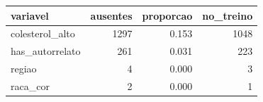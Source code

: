 \begin{tabular}{lrrr}
\toprule
variavel & ausentes & proporcao & no_treino \\
\midrule
colesterol_alto & 1297 & 0.153 & 1048 \\
has_autorrelato & 261 & 0.031 & 223 \\
regiao & 4 & 0.000 & 3 \\
raca_cor & 2 & 0.000 & 1 \\
\bottomrule
\end{tabular}
